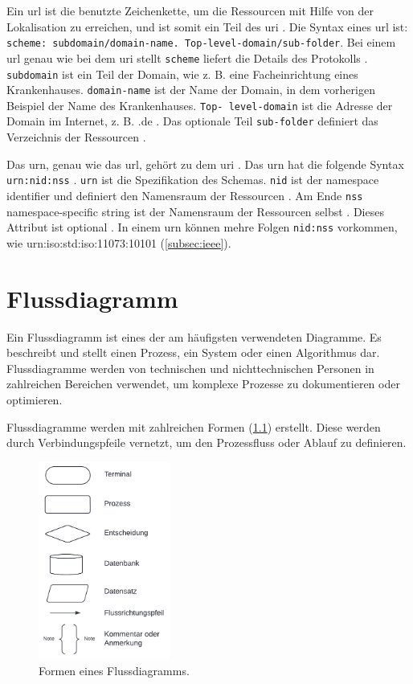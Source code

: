  Ein \acf{url} ist die benutzte Zeichenkette, um die Ressourcen mit Hilfe von der Lokalisation zu erreichen, und ist somit ein Teil des \ac{uri} \cite{uribibdiff2}. Die Syntax eines \ac{url} ist: \texttt{scheme: subdomain/domain-name. Top-level-domain/sub-folder}. Bei einem \ac{url} genau wie bei dem \ac{uri} stellt \texttt{scheme} liefert die Details des Protokolls \cite{uribibdiff}. \texttt{subdomain} ist ein Teil der Domain, wie z. B. eine Facheinrichtung eines Krankenhauses. \texttt{domain-name} ist der Name der Domain, in dem vorherigen Beispiel der Name des Krankenhauses. \texttt{Top- level-domain} ist die Adresse der Domain im Internet, z. B. \glqq .de\grqq{} \cite{uribibdiff}. Das optionale Teil \texttt{sub-folder} definiert das Verzeichnis der Ressourcen \cite{uribibdiff, uribibdiff2}.
 
 Das \acf{urn}, genau wie das \ac{url}, gehört zu dem \ac{uri} \cite{uribibdiff}. Das \ac{urn} hat die folgende Syntax \texttt{urn:nid:nss} \cite{uribibdiff, uribibdiff2}. \texttt{urn} ist die Spezifikation des Schemas. \texttt{nid} ist der \glqq namespace identifier\grqq{} und definiert den Namensraum der Ressourcen \cite{uribibdiff}. Am Ende \texttt{nss} \glqq namespace-specific string\grqq{} ist der Namensraum der Ressourcen selbst \cite{uribibdiff}. Dieses Attribut ist optional \cite{uribibdiff2}. In einem \ac{urn} können mehre Folgen \texttt{nid:nss} vorkommen, wie urn:iso:std:iso:11073:10101 (\ref{subsec:ieee}).

 
 \chapter{Flussdiagramm} \label{sec:flowdiagram}
 
 Ein Flussdiagramm ist eines der am häufigsten verwendeten Diagramme. Es beschreibt und stellt einen Prozess, ein System oder einen Algorithmus dar. Flussdiagramme werden von technischen und nichttechnischen Personen in zahlreichen Bereichen verwendet, um komplexe Prozesse zu dokumentieren oder optimieren.
 
 Flussdiagramme werden mit zahlreichen Formen (\ref{fig:flowdiagramappen}) erstellt. Diese werden durch Verbindungspfeile vernetzt, um den Prozessfluss oder Ablauf zu definieren.
 
 \begin{figure}[ht]
 	\centering
 	\includegraphics[height=6.5cm]{figures/flowdiagram}
 	\caption[Formen eines Flussdiagramms]{Formen eines Flussdiagramms.}
 	\label{fig:flowdiagramappen}
 \end{figure}
